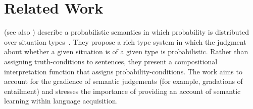 \documentclass[a4paper,11pt]{article}
\renewcommand{\cite}{\citep}
\newcommand{\newcite}[1]{\citet{#1}}
\theoremstyle{definition}
\begin{document}



\section{Related Work}


\newcite{Cooper:14} (see also
\cite{Eijck:12}) describe a probabilistic semantics in which probability is distributed over situation types~\cite{Barwise:83}. They propose a rich type system in which the judgment about whether a given situation is of a given type is probabilistic. Rather than assigning truth-conditions to sentences, they present a compositional interpretation function that assigns probability-conditions. The work aims to account for the gradience of semantic judgements (for example, gradations of entailment) and stresses the importance of providing an account of semantic learning within language acquisition. 
\end{document}
